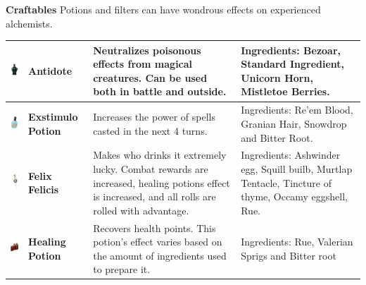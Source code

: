 \textbf{Craftables} Potions and filters can have wondrous effects on experienced alchemists. \\

\begin{tabular}{m{2cm}m{2cm}m{6cm}m{5cm} } \hline
	\includegraphics[width=2cm]{../Pictures/Gameplay/Items/Consumables/Potions/Antidote_potion_picture.png} & \textbf{Antidote} & Neutralizes poisonous effects from magical creatures. Can be used both in battle and outside. & Ingredients: Bezoar, Standard Ingredient, Unicorn Horn, Mistletoe Berries. \\ \hline
	\includegraphics[width=2cm]{../Pictures/Gameplay/Items/Consumables/Potions/Exstimulo_potion_picture.png} & \textbf{Exstimulo Potion} & Increases the power of spells casted in the next 4 turns. & Ingredients: Re'em Blood, Granian Hair, Snowdrop and Bitter Root. \\ \hline
	\includegraphics[width=2cm]{../Pictures/Gameplay/Items/Consumables/Potions/Felix_felicis_potion_picture.png} & \textbf{Felix Felicis} & Makes who drinks it extremely lucky. Combat rewards are increased, healing potions effect is increased, and all rolls are rolled with advantage. & Ingredients: Ashwinder egg, Squill builb, Murtlap Tentacle, Tincture of thyme, Occamy eggshell, Rue. \\ \hline
	\includegraphics[width=2cm]{../Pictures/Gameplay/Items/Consumables/Potions/Healing_potion_picture.png} & \textbf{Healing Potion} & Recovers health points. This potion's effect varies based on the amount of ingredients used to prepare it. & Ingredients: Rue, Valerian Sprigs and Bitter root \\ \hline

\end{tabular}
